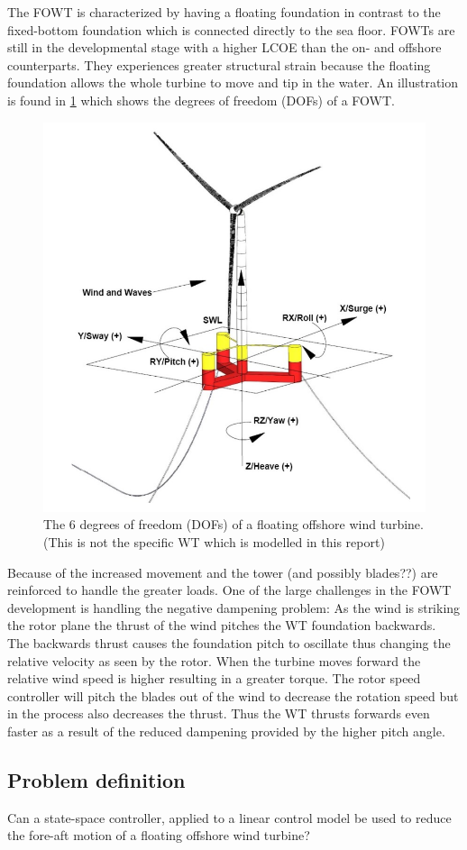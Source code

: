 The FOWT is characterized by having a floating foundation in contrast to the fixed-bottom foundation which is connected directly to the sea floor. FOWTs are still in the developmental stage with a higher LCOE than the on- and offshore counterparts. They experiences greater structural strain because the floating foundation allows the whole turbine to move and tip in the water. An illustration is found in \cref{fig:fowt_coordinates} which shows the degrees of freedom (DOFs) of a FOWT. 
\begin{figure}[h]
	\centering
	\includegraphics[width=0.55\linewidth]{Graphics/FOWTcoordinates.png}
	\caption{The 6 degrees of freedom (DOFs) of a floating offshore wind turbine. (This is not the specific WT which is modelled in this report) \cite{Vanelli2021}}
	\label{fig:fowt_coordinates}
\end{figure}
Because of the increased movement and the tower (and possibly blades??) are reinforced to handle the greater loads. One of the large challenges in the FOWT development is handling the negative dampening problem: As the wind is striking the rotor plane the thrust of the wind pitches the WT foundation backwards. The backwards thrust causes the foundation pitch to oscillate thus changing the relative velocity as seen by the rotor. When the turbine moves forward the relative wind speed is higher resulting in a greater torque. The rotor speed controller will pitch the blades out of the wind to decrease the rotation speed but in the process also decreases the thrust. Thus the WT thrusts forwards even faster as a result of the reduced dampening provided by the higher pitch angle. 



\subsection{Problem definition}
Can a state-space controller, applied to a linear control model be used to reduce the fore-aft motion of a floating offshore wind turbine?


